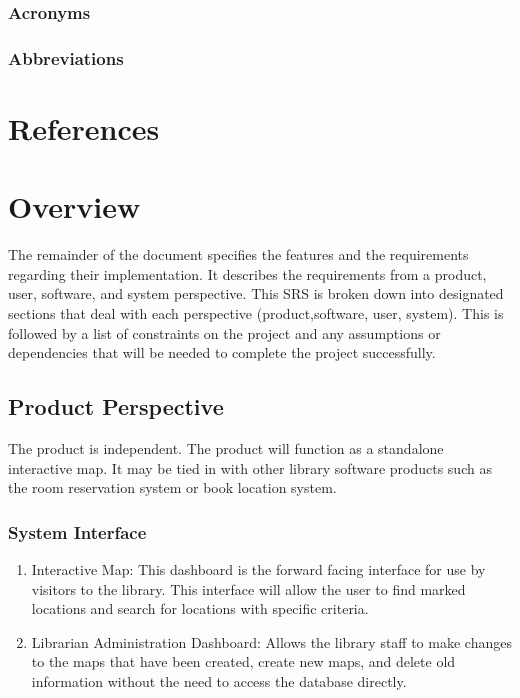 \documentclass[letterpaper,10pt,titlepage]{article}
\begin{document}
\subsubsection{Acronyms}

\subsubsection{Abbreviations}

\section{References}

\section{Overview}
The remainder of the document specifies the features and the requirements regarding their implementation. It describes the requirements from a product, user, software, and system perspective. This SRS is broken down into designated sections that deal with each perspective (product,software, user, system). This is followed by a list of constraints on the project and any assumptions or dependencies that will be needed to complete the project successfully. 

\subsection{Product Perspective}
The product is independent. The product will function as a standalone interactive map. It may be tied in with other library software products such as the room reservation system or book location system.

\subsubsection{System Interface}
\begin{enumerate}
	\item Interactive Map: This dashboard is the forward facing interface for use by visitors to  the library. This interface will allow the user to find marked locations and search for locations with specific criteria.
	\item Librarian Administration Dashboard: Allows the library staff to make changes to the maps that have been created, create new maps, and delete old information without the need to access the database directly.
\end{enumerate}
\end{document}

